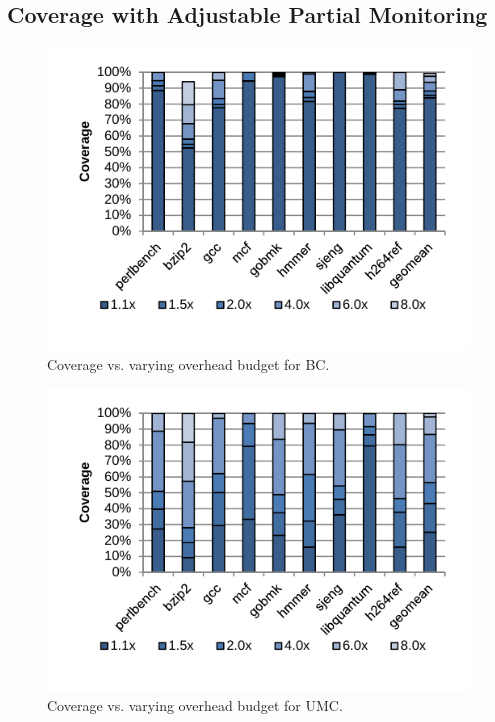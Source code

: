 \subsection{Coverage with Adjustable Partial Monitoring}

\begin{figure}
  \begin{center}
    \includegraphics[width=\linewidth, clip=true, trim=0 0.3in 0 0.1in]{figs/data_bc_sweep.pdf}
    \vspace{-0.2in}
    \caption{Coverage vs. varying overhead budget for BC.}
    \label{fig:evaluation.bc_sweep}
    \vspace{-0.2in}
  \end{center}
\end{figure}

\begin{figure}
  \begin{center}
    \includegraphics[width=\linewidth, clip=true, trim=0 0.3in 0 0.1in]{figs/data_umc_sweep.pdf}
    \vspace{-0.2in}
    \caption{Coverage vs. varying overhead budget for UMC.}
    \label{fig:evaluation.umc_sweep}
    \vspace{-0.1in}
  \end{center}
\end{figure}

